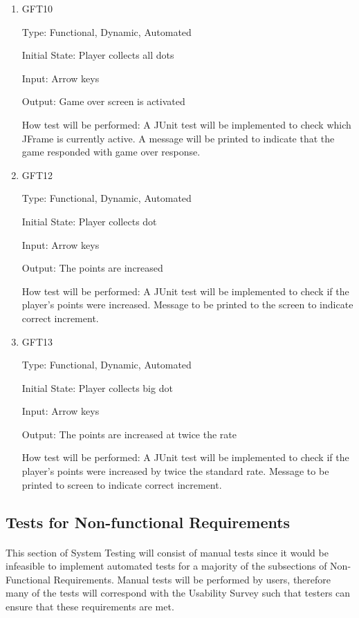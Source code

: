 \documentclass[12pt, titlepage]{article}
\begin{document}
\begin{enumerate}

\item{GFT10\\}

Type: Functional, Dynamic, Automated
					
Initial State: Player collects all dots
					
Input: Arrow keys
					
Output: Game over screen is activated

How test will be performed: A JUnit test will be implemented to check which JFrame is currently active. A message will be printed to indicate that the game responded with game over response.

\item{GFT12\\}

Type: Functional, Dynamic, Automated
					
Initial State: Player collects dot
					
Input: Arrow keys
					
Output: The points are increased

How test will be performed: A JUnit test will be implemented to check if the player's points were increased. Message to be printed to the screen to indicate correct increment.

\item{GFT13\\}

Type: Functional, Dynamic, Automated
					
Initial State: Player collects big dot
					
Input: Arrow keys
					
Output: The points are increased at twice the rate

How test will be performed: A JUnit test will be implemented to check if the player's points were increased by twice the standard rate. Message to be printed to screen to indicate correct increment.

\end{enumerate}

\subsection{Tests for Non-functional Requirements}

\paragraph{}
This section of System Testing will consist of manual tests since it would be infeasible to implement automated tests for a majority of the subsections of Non-Functional Requirements. Manual tests will be performed by users, therefore many of the tests will correspond with the Usability Survey such that testers can ensure that these requirements are met.
\end{document}
